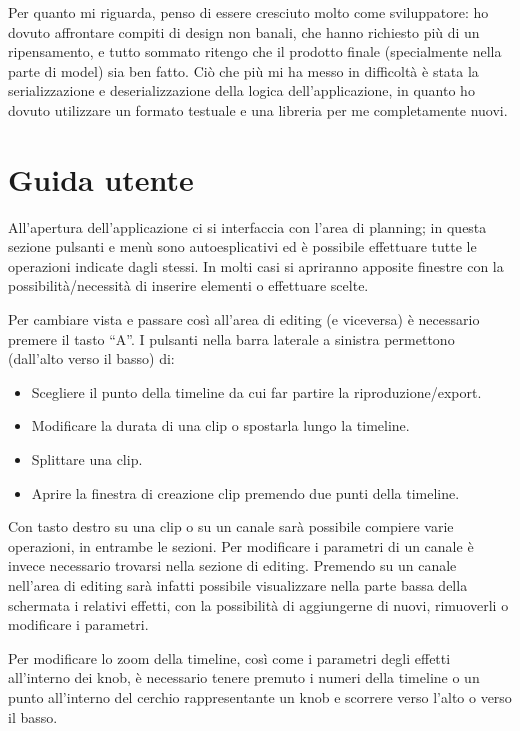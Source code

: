 \documentclass[a4paper,12pt]{report}
\begin{document}
Per quanto mi riguarda, penso di essere cresciuto molto come sviluppatore: ho dovuto affrontare compiti di design non banali, che hanno richiesto più di un ripensamento, e tutto sommato ritengo che il prodotto finale (specialmente nella parte di model) sia ben fatto. Ciò che più mi ha messo in difficoltà è stata la serializzazione e deserializzazione della logica dell’applicazione, in quanto ho dovuto utilizzare un formato testuale e una libreria per me completamente nuovi. 

\appendix
\chapter{Guida utente}
All’apertura dell’applicazione ci si interfaccia con l'area di planning; in questa sezione pulsanti e menù sono autoesplicativi ed è possibile effettuare tutte le operazioni indicate dagli stessi. In molti casi si apriranno apposite finestre con la possibilità/necessità di inserire elementi o effettuare scelte. 

Per cambiare vista e passare così all’area di editing (e viceversa) è necessario premere il tasto “A”. I pulsanti nella barra laterale a sinistra permettono (dall'alto verso il basso) di:
\begin{itemize}
    \item Scegliere il punto della timeline da cui far partire la riproduzione/export.
    \item Modificare la durata di una clip o spostarla lungo la timeline.
    \item Splittare una clip.
    \item Aprire la finestra di creazione clip premendo due punti della timeline.
\end{itemize}

Con tasto destro su una clip o su un canale sarà possibile compiere varie operazioni, in entrambe le sezioni. Per modificare i parametri di un canale è invece necessario trovarsi nella sezione di editing. Premendo su un canale nell’area di editing sarà infatti possibile visualizzare nella parte bassa della schermata i relativi effetti, con la possibilità di aggiungerne di nuovi, rimuoverli o modificare i parametri. 

Per modificare lo zoom della timeline, così come i parametri degli effetti all’interno dei knob, è necessario tenere premuto i numeri della timeline o un punto all’interno del cerchio rappresentante un knob e scorrere verso l’alto o verso il basso.
\end{document}
